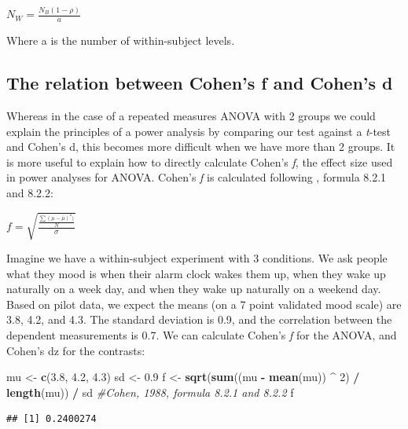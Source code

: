 \documentclass[]{book}
\newenvironment{Shaded}{\begin{snugshade}}{\end{snugshade}}
\newcommand{\CommentTok}[1]{\textcolor[rgb]{0.56,0.35,0.01}{\textit{#1}}}
\newcommand{\DecValTok}[1]{\textcolor[rgb]{0.00,0.00,0.81}{#1}}
\newcommand{\FloatTok}[1]{\textcolor[rgb]{0.00,0.00,0.81}{#1}}
\newcommand{\KeywordTok}[1]{\textcolor[rgb]{0.13,0.29,0.53}{\textbf{#1}}}
\newcommand{\NormalTok}[1]{#1}
\newcommand{\OperatorTok}[1]{\textcolor[rgb]{0.81,0.36,0.00}{\textbf{#1}}}
\newcommand{\StringTok}[1]{\textcolor[rgb]{0.31,0.60,0.02}{#1}}
\begin{document}
\(N_{W}=\frac{N_{B}(1-\rho)}{a}\)

Where a is the number of within-subject levels.

\hypertarget{the-relation-between-cohens-f-and-cohens-d}{%
\subsection{The relation between Cohen's f and Cohen's d}\label{the-relation-between-cohens-f-and-cohens-d}}

Whereas in the case of a repeated measures ANOVA with 2 groups we could explain the principles of a power analysis by comparing our test against a \emph{t}-test and Cohen's d, this becomes more difficult when we have more than 2 groups. It is more useful to explain how to directly calculate Cohen's \emph{f}, the effect size used in power analyses for ANOVA. Cohen's \emph{f} is calculated following \citet{cohen1988spa}, formula 8.2.1 and 8.2.2:

\(f = \sqrt{\frac{\frac{\sum(\mu-\overline{\mu})^2)}N}\sigma}\)

Imagine we have a within-subject experiment with 3 conditions. We ask people what they mood is when their alarm clock wakes them up, when they wake up naturally on a week day, and when they wake up naturally on a weekend day. Based on pilot data, we expect the means (on a 7 point validated mood scale) are 3.8, 4.2, and 4.3. The standard deviation is 0.9, and the correlation between the dependent measurements is 0.7. We can calculate Cohen's \emph{f} for the ANOVA, and Cohen's dz for the contrasts:

\begin{Shaded}
\begin{Highlighting}[]
\NormalTok{mu <-}\StringTok{ }\KeywordTok{c}\NormalTok{(}\FloatTok{3.8}\NormalTok{, }\FloatTok{4.2}\NormalTok{, }\FloatTok{4.3}\NormalTok{)}
\NormalTok{sd <-}\StringTok{ }\FloatTok{0.9}
\NormalTok{f <-}\StringTok{ }\KeywordTok{sqrt}\NormalTok{(}\KeywordTok{sum}\NormalTok{((mu }\OperatorTok{-}\StringTok{ }\KeywordTok{mean}\NormalTok{(mu)) }\OperatorTok{^}\StringTok{ }\DecValTok{2}\NormalTok{) }\OperatorTok{/}\StringTok{ }\KeywordTok{length}\NormalTok{(mu)) }\OperatorTok{/}\StringTok{ }\NormalTok{sd }
\CommentTok{#Cohen, 1988, formula 8.2.1 and 8.2.2}
\NormalTok{  f}
\end{Highlighting}
\end{Shaded}

\begin{verbatim}
## [1] 0.2400274
\end{verbatim}
\end{document}
